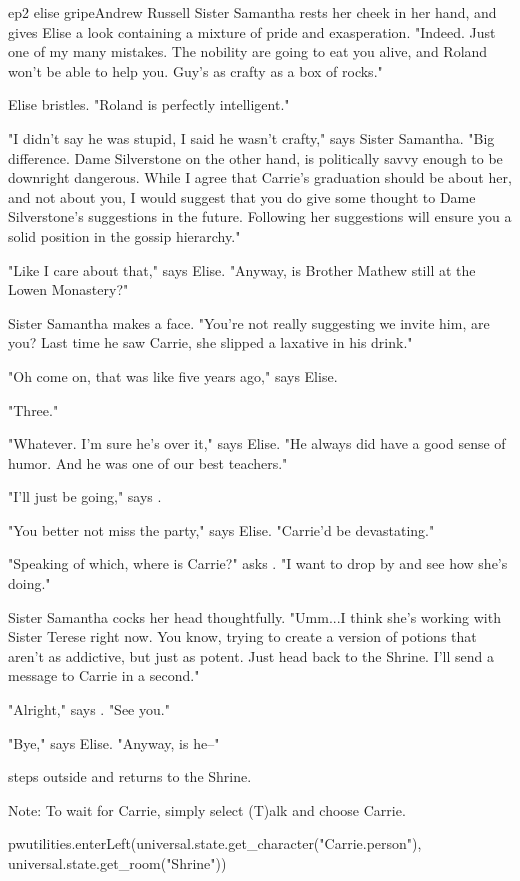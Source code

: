 \documentclass{book}
\begin{document}
\begin{childnode}{ep2 elise gripe}{Andrew Russell}
    Sister Samantha rests her cheek in her hand, and gives Elise a look containing a mixture of pride and exasperation. "Indeed. Just one of my many mistakes. The nobility are going to eat you alive, 
    and Roland won't be able to help you. Guy's as crafty as a box of rocks."

    Elise bristles. "Roland is perfectly intelligent."

    "I didn't say he was stupid, I said he wasn't crafty," says Sister Samantha. "Big difference. Dame Silverstone on the other hand, is politically savvy enough to be downright dangerous. While I agree that Carrie's graduation should be about her, and not about you, 
    I would suggest that you do give some thought to Dame Silverstone's suggestions in the future. Following her suggestions will ensure you a solid position in the gossip hierarchy."
    
    "Like I care about that," says Elise. "Anyway, is Brother Mathew still at the Lowen Monastery?"

    Sister Samantha makes a face. "You're not really suggesting we invite him, are you? Last time he saw Carrie, she slipped a laxative in his drink."

    "Oh come on, that was like five years ago," says Elise.

    "Three."

    "Whatever. I'm sure he's over it," says Elise. "He always did have a good sense of humor. And he was one of our best teachers."

    "I'll just be going," says \name{}.

    "You better not miss the party," says Elise. "Carrie'd be devastating."

    "Speaking of which, where is Carrie?" asks \name{}. "I want to drop by and see how she's doing."

    Sister Samantha cocks her head thoughtfully. "Umm...I think she's working with Sister Terese right now. You know, trying to create a version of potions that aren't as addictive, but just as potent. Just head back to the Shrine. I'll send a message to Carrie
    in a second."

    "Alright," says \name{}. "See you."

    "Bye," says Elise. "Anyway, is he--"

    \name{} steps outside and returns to the Shrine.

    Note: To wait for Carrie, simply select (T)alk and choose Carrie.

    \begin{code}

        pwutilities.enterLeft(universal.state.get\_character("Carrie.person"), universal.state.get\_room("Shrine"))

    \end{code}

\end{childnode}
\end{document}
